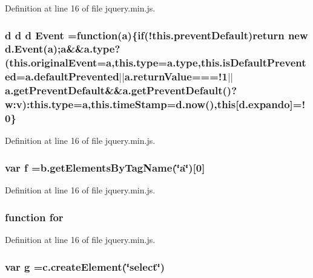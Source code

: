 Definition at line 16 of file jquery.\-min.\-js.

\subsubsection[{Event}]{\setlength{\rightskip}{0pt plus 5cm}d d d Event =function({\bf a})\{{\bf if}(!this.\-prevent\-Default)return new d.\-Event({\bf a});{\bf a}\&\&{\bf a.\-type}?(this.\-original\-Event={\bf a},{\bf this.\-type}={\bf a.\-type},this.\-is\-Default\-Prevented=a.\-default\-Prevented$|$$|$a.\-return\-Value===!1$|$$|$a.\-get\-Prevent\-Default\&\&a.\-get\-Prevent\-Default()?w\-:v)\-:{\bf this.\-type}={\bf a},this.\-time\-Stamp=d.\-now(),this[d.\-expando]=!0\}}\label{jquery_8min_8js_a2ae7f8e4fe664ff28097e11a6d68ef11}


Definition at line 16 of file jquery.\-min.\-js.

\subsubsection[{f}]{\setlength{\rightskip}{0pt plus 5cm}var f =b.\-get\-Elements\-By\-Tag\-Name(\char`\"{}a\char`\"{})[0]}\label{jquery_8min_8js_a9cf09a2972472098a4c689fd988f4dfc}


Definition at line 16 of file jquery.\-min.\-js.

\subsubsection[{for}]{\setlength{\rightskip}{0pt plus 5cm}function for}\label{jquery_8min_8js_aad23afb7f0a7aabf30040ba327821efc}


Definition at line 16 of file jquery.\-min.\-js.

\subsubsection[{g}]{\setlength{\rightskip}{0pt plus 5cm}var g =c.\-create\-Element(\char`\"{}select\char`\"{})}\label{jquery_8min_8js_a103df269476e78897c9c4c6cb8f4eb06}


